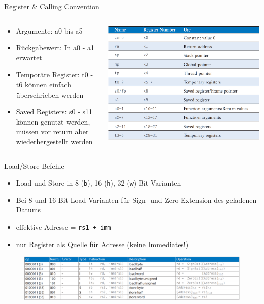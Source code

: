 \documentclass[
  german,            %
  aspectratio=169,    %
]{tumbeamer}
\begin{document}
\begin{frame}[c]{Register \& Calling Convention}{}
  \begin{columns}[c]
    \begin{column}{0.5\textwidth}
      \begin{itemize}
        \item Argumente: a0 bis a5
        \item Rückgabewert: In a0 - a1 erwartet
        \item Temporäre Register: t0 - t6 können einfach überschrieben werden
        \item Saved Registers: s0 - s11 können genutzt werden, müssen vor return aber wiederhergestellt werden
      \end{itemize}
    \end{column}
    \begin{column}{0.5\textwidth}
      \includegraphics[width=\linewidth]{riscv_registers.png}
    \end{column}
  \end{columns}
\end{frame}

\begin{frame}{Load/Store Befehle}
	\begin{itemize}
		\item Load und Store in 8 (\texttt{b}), 16 (\texttt{h}), 32 (\texttt{w}) Bit Varianten
		\item Bei 8 und 16 Bit-Load Varianten für Sign- und Zero-Extension des geladenen Datums
		\item effektive Adresse = \texttt{rs1 + imm}
		\item nur Register als Quelle für Adresse (keine Immediates!)
	\end{itemize}
	\begin{figure}
		\centering
		\includegraphics[width=.95\textwidth]{w03_loadbefehle.png}
	\end{figure}
\end{frame}
\end{document}
